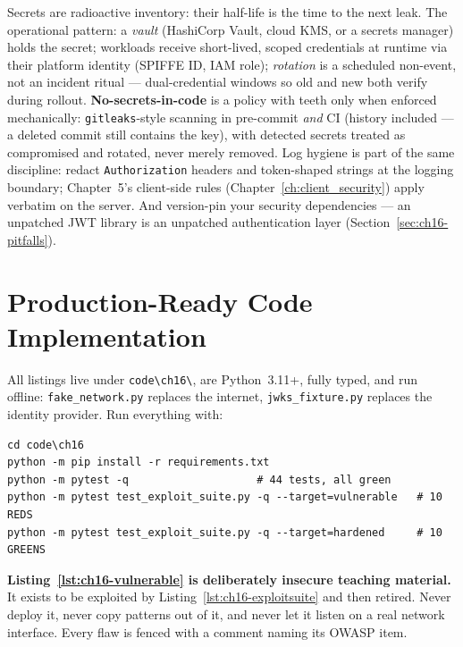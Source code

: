 Secrets are radioactive inventory: their half-life is the time to the next
leak. The operational pattern: a \emph{vault} (HashiCorp Vault, cloud KMS,
or a secrets manager) holds the secret; workloads receive short-lived,
scoped credentials at runtime via their platform identity (SPIFFE ID, IAM
role); \emph{rotation} is a scheduled non-event, not an incident ritual ---
dual-credential windows so old and new both verify during rollout.
\textbf{No-secrets-in-code} is a policy with teeth only when enforced
mechanically: \texttt{gitleaks}-style scanning in pre-commit \emph{and} CI
(history included --- a deleted commit still contains the key), with
detected secrets treated as compromised and rotated, never merely removed.
Log hygiene is part of the same discipline: redact \texttt{Authorization}
headers and token-shaped strings at the logging boundary; Chapter~5's
client-side rules (Chapter~\ref{ch:client_security}) apply verbatim on the
server. And version-pin your security dependencies --- an unpatched JWT
library is an unpatched authentication layer
(Section~\ref{sec:ch16-pitfalls}).

\section{Production-Ready Code Implementation}
\label{sec:ch16-code}

All listings live under \texttt{code\textbackslash{}ch16\textbackslash{}},
are Python~3.11+, fully typed, and run offline: \texttt{fake\_network.py}
replaces the internet, \texttt{jwks\_fixture.py} replaces the identity
provider. Run everything with:

\begin{verbatim}
cd code\ch16
python -m pip install -r requirements.txt
python -m pytest -q                    # 44 tests, all green
python -m pytest test_exploit_suite.py -q --target=vulnerable   # 10 REDS
python -m pytest test_exploit_suite.py -q --target=hardened     # 10 GREENS
\end{verbatim}

\begin{warningbox}
\textbf{Listing~\ref{lst:ch16-vulnerable} is deliberately insecure teaching
material.} It exists to be exploited by
Listing~\ref{lst:ch16-exploitsuite} and then retired. Never deploy it,
never copy patterns out of it, and never let it listen on a real network
interface. Every flaw is fenced with a comment naming its OWASP item.
\end{warningbox}

